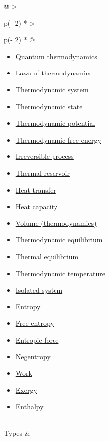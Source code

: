 \documentclass[
]{article}
\providecommand{\tightlist}{%
  \setlength{\itemsep}{0pt}\setlength{\parskip}{0pt}}
\newenvironment{LTR}{\beginL}{\endL}
\begin{document}
\begin{LTR}
\begin{otherlanguage}{english}
\begin{longtable}[]{@{}
  >{\raggedright\arraybackslash}p{(\columnwidth - 2\tabcolsep) * }
  >{\raggedright\arraybackslash}p{(\columnwidth - 2\tabcolsep) * }@{}}
\begin{minipage}[t]{\linewidth}
\begin{itemize}
  \begin{itemize}
  \tightlist
  \item
    \href{/wiki/Quantum_thermodynamics}{Quantum thermodynamics}
  \item
    \href{/wiki/Laws_of_thermodynamics}{Laws of thermodynamics}
  \item
    \href{/wiki/Thermodynamic_system}{Thermodynamic system}
  \item
    \href{/wiki/Thermodynamic_state}{Thermodynamic state}
  \item
    \href{/wiki/Thermodynamic_potential}{Thermodynamic potential}
  \item
    \href{/wiki/Thermodynamic_free_energy}{Thermodynamic free energy}
  \item
    \href{/wiki/Irreversible_process}{Irreversible process}
  \item
    \href{/wiki/Thermal_reservoir}{Thermal reservoir}
  \item
    \href{/wiki/Heat_transfer}{Heat transfer}
  \item
    \href{/wiki/Heat_capacity}{Heat capacity}
  \item
    \href{/wiki/Volume_(thermodynamics)}{Volume (thermodynamics)}
  \item
    \href{/wiki/Thermodynamic_equilibrium}{Thermodynamic equilibrium}
  \item
    \href{/wiki/Thermal_equilibrium}{Thermal equilibrium}
  \item
    \href{/wiki/Thermodynamic_temperature}{Thermodynamic temperature}
  \item
    \href{/wiki/Isolated_system}{Isolated system}
  \item
    \href{/wiki/Entropy}{Entropy}
  \item
    \href{/wiki/Free_entropy}{Free entropy}
  \item
    \href{/wiki/Entropic_force}{Entropic force}
  \item
    \href{/wiki/Negentropy}{Negentropy}
  \item
    \href{/wiki/Work_(physics)}{Work}
  \item
    \href{/wiki/Exergy}{Exergy}
  \item
    \href{/wiki/Enthalpy}{Enthalpy}
  \end{itemize}
\end{itemize}
\end{minipage} \\
Types & \begin{minipage}[t]{\linewidth}\raggedright

\end{minipage}
\end{longtable}
\end{otherlanguage}
\end{LTR}
\end{document}
